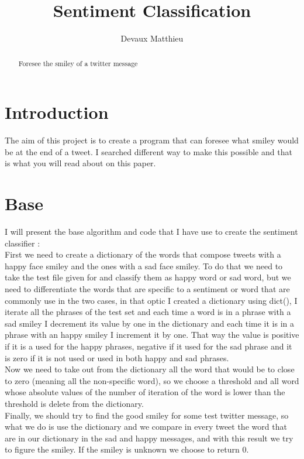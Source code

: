\documentclass{article}
\begin{document}
\title{Sentiment Classification}
\author{Devaux Matthieu}


\maketitle

\begin{abstract}
Foresee the smiley of a twitter message
\end{abstract}

\section{Introduction}

The aim of this project is to create a program that can foresee what smiley would be at the end of a tweet. I searched different way to make this possible and that is what you will read about on this paper.


\section{Base}

I will present the base algorithm and code that I have use to create the sentiment classifier :\\
First we need to create a dictionary of the words that compose tweets with a happy face smiley and the ones with a sad face smiley. To do that we need to take the test file given for and classify them as happy word or sad word, but we need to differentiate the words that are specific to a sentiment or word that are commonly use in the two cases, in that optic I created a dictionary using dict(), I iterate all the phrases of the test set and each time a word is in a phrase with a sad smiley I decrement its value by one in the dictionary and each time it is in a phrase with an happy smiley I increment it by one. That way the value is positive if it is a used for the happy phrases, negative if it used for the sad phrase and it is zero if it is not used or used in both happy and sad phrases. \\
Now we need to take out from the dictionary all the word that would be to close to zero (meaning all the non-specific word), so we choose a threshold and all word whose absolute values of the number of iteration of the word is lower than the threshold is delete from the dictionary.\\
Finally, we should try to find the good smiley for some test twitter message, so what we do is use the dictionary and we compare in every tweet the word that are in our dictionary in the sad and happy messages, and with this result we try to figure the smiley. If the smiley is unknown we choose to return 0.
\end{document}
